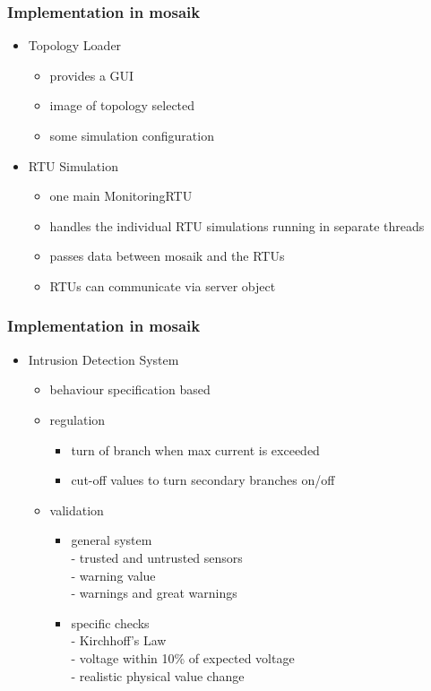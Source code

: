 \documentclass{beamer}
\begin{document}
\begin{frame}
	\frametitle{Implementation in mosaik}
	\begin{itemize}
		\item Topology Loader
			\begin{itemize}
				\item provides a GUI
				\item image of topology selected
				\item some simulation configuration
			\end{itemize}
		\pause
		\item RTU Simulation
			\begin{itemize}
				\item one main MonitoringRTU
				\item handles the individual RTU simulations running in separate threads
				\item passes data between mosaik and the RTUs
				\item RTUs can communicate via server object
			\end{itemize}
	\end{itemize}
\end{frame}

\begin{frame}
	\frametitle{Implementation in mosaik}
	\begin{itemize}
		\item Intrusion Detection System
			\begin{itemize}
				\item behaviour specification based
				\pause
				\item regulation
					\begin{itemize}
						\item turn of branch when max current is exceeded
						\item cut-off values to turn secondary branches on/off
					\end{itemize}
				\pause
				\item validation
					\begin{itemize}
						\item general system \\
								\quad - trusted and untrusted sensors \\
								\quad - warning value \\
								\quad - warnings and great warnings \\
						\item specific checks \\
								\quad - Kirchhoff's Law \\
								\quad - voltage within 10\% of expected voltage \\
								\quad - realistic physical value change
					\end{itemize}
			\end{itemize}
	\end{itemize}
\end{frame}
\end{document}
